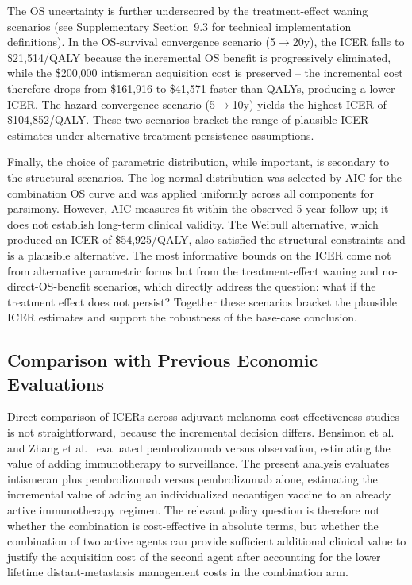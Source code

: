 \documentclass[12pt,a4paper]{article}
\begin{document}
The OS uncertainty is further underscored by the treatment-effect waning scenarios (see Supplementary Section~9.3 for technical implementation definitions). In the OS-survival convergence scenario (5$\to$20y), the ICER falls to \$21,514/QALY because the incremental OS benefit is progressively eliminated, while the \$200,000 intismeran acquisition cost is preserved -- the incremental cost therefore drops from \$161,916 to \$41,571 faster than QALYs, producing a lower ICER. The hazard-convergence scenario (5$\to$10y) yields the highest ICER of \$104,852/QALY. These two scenarios bracket the range of plausible ICER estimates under alternative treatment-persistence assumptions.

Finally, the choice of parametric distribution, while important, is secondary to the structural scenarios. The log-normal distribution was selected by AIC for the combination OS curve and was applied uniformly across all components for parsimony. However, AIC measures fit within the observed 5-year follow-up; it does not establish long-term clinical validity. The Weibull alternative, which produced an ICER of \$54,925/QALY, also satisfied the structural constraints and is a plausible alternative. The most informative bounds on the ICER come not from alternative parametric forms but from the treatment-effect waning and no-direct-OS-benefit scenarios, which directly address the question: what if the treatment effect does not persist? Together these scenarios bracket the plausible ICER estimates and support the robustness of the base-case conclusion.\subsection{Comparison with Previous Economic Evaluations}

Direct comparison of ICERs across adjuvant melanoma cost-effectiveness studies is not straightforward, because the incremental decision differs. Bensimon et al.\ \cite{bensimon2019} and Zhang et al.\ \cite{zhang2023} evaluated \mbox{pembrolizumab} versus observation, estimating the value of adding immunotherapy to surveillance. The present analysis evaluates intismeran plus \mbox{pembrolizumab} versus \mbox{pembrolizumab} alone, estimating the incremental value of adding an individualized neoantigen vaccine to an already active immunotherapy regimen. The relevant policy question is therefore not whether the combination is cost-effective in absolute terms, but whether the combination of two active agents can provide sufficient additional clinical value to justify the acquisition cost of the second agent after accounting for the lower lifetime distant-metastasis management costs in the combination arm.
\end{document}
